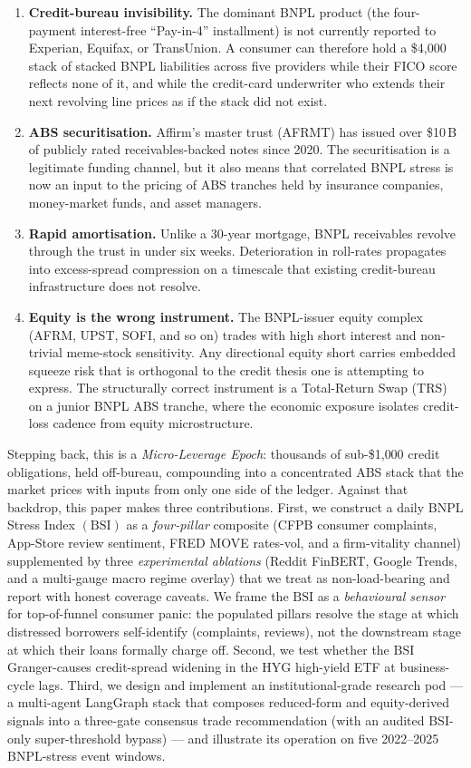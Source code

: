 \documentclass[11pt,letterpaper]{article}
\newcommand{\bsi}{\text{BSI}}
\begin{document}
\begin{enumerate}[leftmargin=*]
\item \textbf{Credit-bureau invisibility.} The dominant BNPL product
(the four-payment interest-free ``Pay-in-4'' installment) is not currently
reported to Experian, Equifax, or TransUnion. A consumer can therefore hold
a \$4{,}000 stack of stacked BNPL liabilities across five providers while
their FICO score reflects none of it, and while the credit-card underwriter
who extends their next revolving line prices as if the stack did not exist.
\item \textbf{ABS securitisation.} Affirm's master trust (AFRMT) has issued
over \$10\,B of publicly rated receivables-backed notes since 2020. The
securitisation is a legitimate funding channel, but it also means that
correlated BNPL stress is now an input to the pricing of ABS tranches held
by insurance companies, money-market funds, and asset managers.
\item \textbf{Rapid amortisation.} Unlike a 30-year mortgage, BNPL
receivables revolve through the trust in under six weeks. Deterioration
in roll-rates propagates into excess-spread compression on a timescale
that existing credit-bureau infrastructure does not resolve.
\item \textbf{Equity is the wrong instrument.} The BNPL-issuer equity
complex (AFRM, UPST, SOFI, and so on) trades with high short interest and
non-trivial meme-stock sensitivity. Any directional equity short carries
embedded squeeze risk that is orthogonal to the credit thesis one is
attempting to express. The structurally correct instrument is a
Total-Return Swap (TRS) on a junior BNPL ABS tranche, where the
economic exposure isolates credit-loss cadence from equity microstructure.
\end{enumerate}

Stepping back, this is a \emph{Micro-Leverage Epoch}: thousands of
sub-\$1{,}000 credit obligations, held off-bureau, compounding into a
concentrated ABS stack that the market prices with inputs from only one
side of the ledger. Against that backdrop, this paper makes three
contributions. First, we construct a daily BNPL Stress Index $(\bsi)$
as a \emph{four-pillar} composite (CFPB consumer complaints,
App-Store review sentiment, FRED MOVE rates-vol, and a firm-vitality
channel) supplemented by three \emph{experimental ablations}
(Reddit FinBERT, Google Trends, and a multi-gauge macro regime
overlay) that we treat as non-load-bearing and report with honest
coverage caveats. We frame the $\bsi$ as a \emph{behavioural
sensor} for top-of-funnel consumer panic: the populated pillars
resolve the stage at which distressed borrowers self-identify
(complaints, reviews), not the downstream stage at which their
loans formally charge off. Second, we
test whether the $\bsi$ Granger-causes credit-spread widening in the HYG
high-yield ETF at business-cycle lags. Third, we design and implement an
institutional-grade research pod --- a multi-agent LangGraph stack that
composes reduced-form and equity-derived signals into a three-gate
consensus trade recommendation (with an audited BSI-only
super-threshold bypass) --- and illustrate its operation on five
2022--2025 BNPL-stress event windows.
\end{document}
